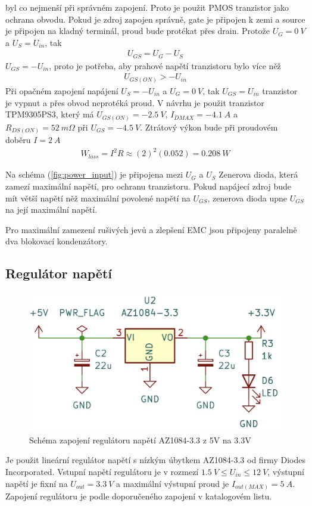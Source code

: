byl co nejmenší při správném zapojení. Proto je použit PMOS tranzistor jako ochrana obvodu. Pokud je zdroj zapojen správně, gate je připojen k zemi a source je připojen na kladný terminál, proud bude protékat přes drain. Protože $ U_G = 0 \ V$ a $U_S = U_{in}$, tak
\begin{align*}
    U_{GS} = U_G - U_S
\end{align*}
$U_{GS} = -U_{in} $, proto je potřeba, aby prahové napětí tranzistoru bylo více něž
\begin{align*}
    U_{GS(ON)} > -U_{in}
\end{align*}
Při opačném zapojení napájení $U_S = -U_{in}$ a $ U_G = 0 \ V$, tak  $U_{GS} = U_{in}$ tranzistor je vypnut a přes obvod neprotéká proud.
V návrhu je použit tranzistor TPM9305PS3, který má  $U_{GS(ON)} = -2.5 \ V $,  $I_{D MAX} = -4.1 \ A$ a $R_{DS(ON)} = 52 \ m \Omega$ při $U_{GS} = -4.5 \ V$.
Ztrátový výkon bude při proudovém doběru $I = 2 \ A$
\begin{align*}
    W_{loss} = I^2 R \approx (2)^2 (0.052) =  0.208 \ W
\end{align*}

Na schéma (\ref{fig:power_input}) je připojena mezi $U_G$ a $U_S$ Zenerova dioda, která zamezí maximální napětí, pro ochranu tranzistoru. Pokud napájecí zdroj bude mít větší napětí něž maximální povolené napětí na $U_{GS}$, zenerova dioda upne $U_{GS}$ na její maximální napětí.
\par
Pro maximální zamezení rušivých jevů a zlepšení EMC jsou připojeny paralelně dva blokovací kondenzátory.
\subsection*{Regulátor napětí}
\begin{figure}[H]
    \includegraphics[width=0.9\linewidth]{pictures/ldo_3v3.jpg}
    \caption{Schéma zapojení regulátoru napětí AZ1084-3.3 z 5V na 3.3V}
    \label{fig:stepdown}
\end{figure}
Je použit lineární regulátor napětí s nízkým úbytkem AZ1084-3.3 od firmy Diodes Incorporated.
Vstupní napětí regulátoru je v rozmezí $1.5 \ V \leq U_{in} \leq 12 \ V $, výstupní napětí je fixní na $U_{out} = 3.3 \ V$ a maximální výstupní proud je $I_{out(MAX)} = 5 \ A$. Zapojení regulátoru je podle doporučeného zapojení v katalogovém listu.


